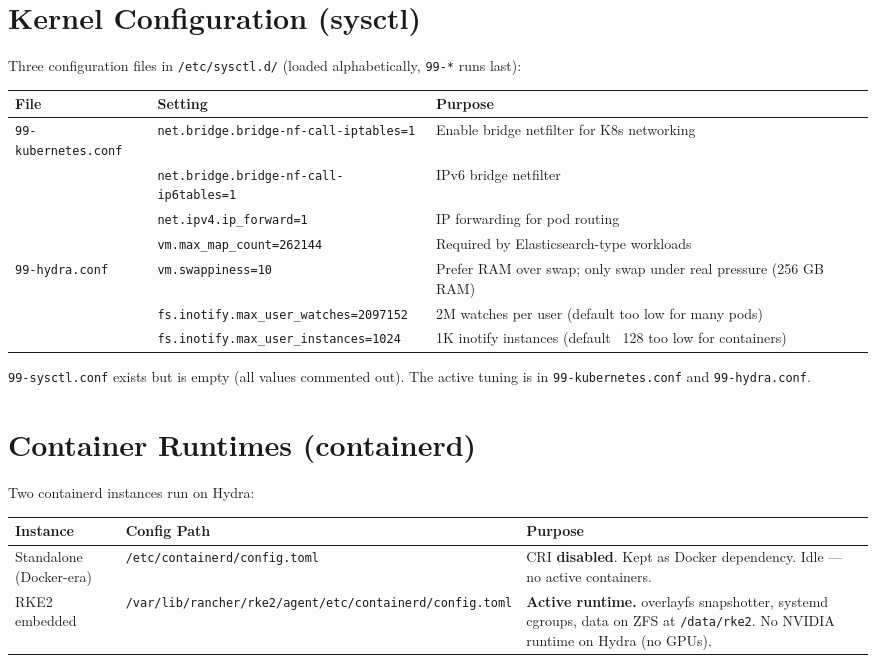 \documentclass[11pt,a4paper]{article}
\begin{document}
\section{Kernel Configuration (sysctl)}

Three configuration files in \texttt{/etc/sysctl.d/} (loaded alphabetically, \texttt{99-*} runs last):

\begin{table}[H]
\centering
\begin{tabular}{llp{6cm}}
\toprule
\textbf{File} & \textbf{Setting} & \textbf{Purpose} \\
\midrule
\texttt{99-kubernetes.conf} & \texttt{net.bridge.bridge-nf-call-iptables=1} & Enable bridge netfilter for K8s networking \\
 & \texttt{net.bridge.bridge-nf-call-ip6tables=1} & IPv6 bridge netfilter \\
 & \texttt{net.ipv4.ip\_forward=1} & IP forwarding for pod routing \\
 & \texttt{vm.max\_map\_count=262144} & Required by Elasticsearch-type workloads \\
\midrule
\texttt{99-hydra.conf} & \texttt{vm.swappiness=10} & Prefer RAM over swap; only swap under real pressure (256 GB RAM) \\
 & \texttt{fs.inotify.max\_user\_watches=2097152} & 2M watches per user (default too low for many pods) \\
 & \texttt{fs.inotify.max\_user\_instances=1024} & 1K inotify instances (default ~128 too low for containers) \\
\bottomrule
\end{tabular}
\end{table}

\begin{infobox}
\texttt{99-sysctl.conf} exists but is empty (all values commented out). The active tuning is in \texttt{99-kubernetes.conf} and \texttt{99-hydra.conf}.
\end{infobox}

\section{Container Runtimes (containerd)}

Two containerd instances run on Hydra:

\begin{table}[H]
\centering
\begin{tabular}{lp{4cm}p{6cm}}
\toprule
\textbf{Instance} & \textbf{Config Path} & \textbf{Purpose} \\
\midrule
Standalone (Docker-era) & \texttt{/etc/containerd/config.toml} & CRI \textbf{disabled}. Kept as Docker dependency. Idle --- no active containers. \\
RKE2 embedded & \texttt{/var/lib/rancher/rke2/agent/etc/containerd/config.toml} & \textbf{Active runtime.} overlayfs snapshotter, systemd cgroups, data on ZFS at \texttt{/data/rke2}. No NVIDIA runtime on Hydra (no GPUs). \\
\bottomrule
\end{tabular}
\end{table}
\end{document}
